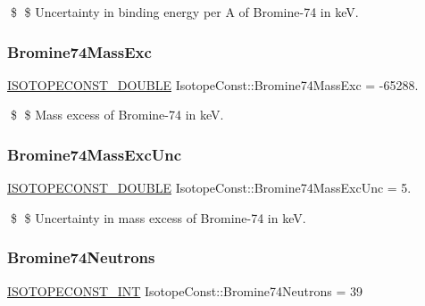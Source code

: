 \$ \$ Uncertainty in binding energy per A of Bromine-\/74 in keV. \mbox{\label{group___isotope_const-_bromine-_br74_ga8d05d830261a87a9ba2e3e7ca6e551b2}} 
\subsubsection{\texorpdfstring{Bromine74\+Mass\+Exc}{Bromine74MassExc}}
{\footnotesize\ttfamily \mbox{\hyperlink{group___isotope_const-_macros_ga8f45a7272ce02c0b4c65c44636ed719a}{I\+S\+O\+T\+O\+P\+E\+C\+O\+N\+S\+T\+\_\+\+D\+O\+U\+B\+LE}} Isotope\+Const\+::\+Bromine74\+Mass\+Exc = -\/65288.}

\$ \$ Mass excess of Bromine-\/74 in keV. \mbox{\label{group___isotope_const-_bromine-_br74_gaf09eb62a5066f4528d4eee92b5e39ade}} 
\subsubsection{\texorpdfstring{Bromine74\+Mass\+Exc\+Unc}{Bromine74MassExcUnc}}
{\footnotesize\ttfamily \mbox{\hyperlink{group___isotope_const-_macros_ga8f45a7272ce02c0b4c65c44636ed719a}{I\+S\+O\+T\+O\+P\+E\+C\+O\+N\+S\+T\+\_\+\+D\+O\+U\+B\+LE}} Isotope\+Const\+::\+Bromine74\+Mass\+Exc\+Unc = 5.}

\$ \$ Uncertainty in mass excess of Bromine-\/74 in keV. \mbox{\label{group___isotope_const-_bromine-_br74_gad4f927bd79d7ab789a20fcfa64a3418b}} 
\subsubsection{\texorpdfstring{Bromine74\+Neutrons}{Bromine74Neutrons}}
{\footnotesize\ttfamily \mbox{\hyperlink{group___isotope_const-_macros_ga5f18360b3e99483a35c32d789e62621c}{I\+S\+O\+T\+O\+P\+E\+C\+O\+N\+S\+T\+\_\+\+I\+NT}} Isotope\+Const\+::\+Bromine74\+Neutrons = 39}

